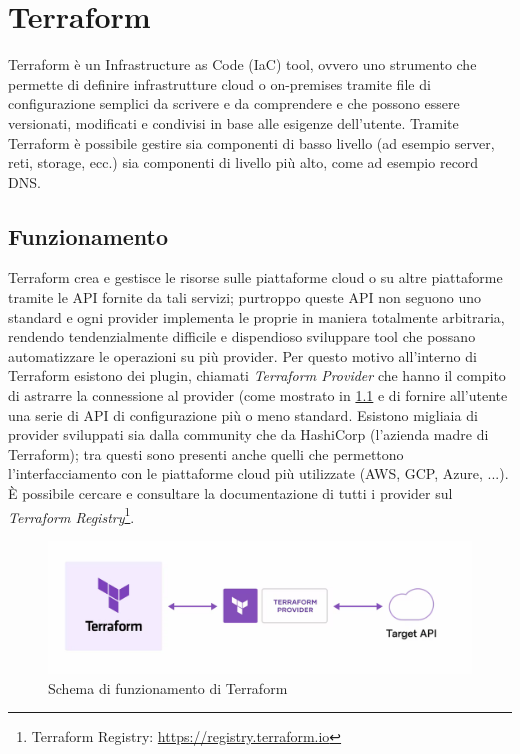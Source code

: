 \chapter{Terraform}\label{sec:terraform}

Terraform è un Infrastructure as Code (IaC) tool, ovvero uno strumento che permette di definire infrastrutture cloud o on-premises tramite file di configurazione semplici da scrivere e da comprendere e che possono essere versionati, modificati e condivisi in base alle esigenze dell'utente. Tramite Terraform è possibile gestire sia componenti di basso livello (ad esempio server, reti, storage, ecc.) sia componenti di livello più alto, come ad esempio record DNS.

\section{Funzionamento}

Terraform crea e gestisce le risorse sulle piattaforme cloud o su altre piattaforme tramite le API fornite da tali servizi; purtroppo queste API non seguono uno standard e ogni provider implementa le proprie in maniera totalmente arbitraria, rendendo tendenzialmente difficile e dispendioso sviluppare tool che possano automatizzare le operazioni su più provider. Per questo motivo all'interno di Terraform esistono dei plugin, chiamati \emph{Terraform Provider} che hanno il compito di astrarre la connessione al provider (come mostrato in \cref{fig:terraform_how_works} e di fornire all'utente una serie di API di configurazione più o meno standard. Esistono migliaia di provider sviluppati sia dalla community che da HashiCorp (l'azienda madre di Terraform); tra questi sono presenti anche quelli che permettono l'interfacciamento con le piattaforme cloud più utilizzate (AWS, GCP, Azure, ...). È possibile cercare e consultare la documentazione di tutti i provider sul \emph{Terraform Registry}\footnote{Terraform Registry: \url{https://registry.terraform.io}}.

\begin{figure}[H]
    \center
    \includegraphics[scale=0.1]{tesi/files/immagini/terraform/how_works.png}
    \caption{Schema di funzionamento di Terraform}
    \label{fig:terraform_how_works}
\end{figure}

